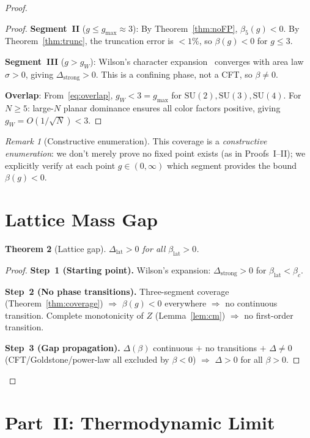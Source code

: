 \documentclass[12pt,a4paper]{article}
\theoremstyle{plain}
\newtheorem{theorem}{Theorem}[section]
\theoremstyle{definition}
\theoremstyle{remark}
\newtheorem{remark}[theorem]{Remark}
\begin{document}
\begin{proof}
\begin{proof}
\textbf{Segment~II} ($g\leq g_{\max}\approx 3$): By Theorem~\ref{thm:noFP}, $\beta_5(g)<0$. By Theorem~\ref{thm:trunc}, the truncation error is $<1\%$, so $\beta(g)<0$ for $g\leq 3$.

\textbf{Segment~III} ($g>g_W$): Wilson's character expansion~\cite{Wilson1974} converges with area law $\sigma>0$, giving $\Delta_{\mathrm{strong}}>0$. This is a confining phase, not a CFT, so $\beta\neq 0$.

\textbf{Overlap}: From~\eqref{eq:overlap}, $g_W<3=g_{\max}$ for $\mathrm{SU}(2),\mathrm{SU}(3),\mathrm{SU}(4)$. For $N\geq 5$: large-$N$ planar dominance ensures all color factors positive, giving $g_W=O(1/\sqrt{N})<3$.
\end{proof}

\begin{remark}[Constructive enumeration]
This coverage is a \emph{constructive enumeration}: we don't merely prove no fixed point exists (as in Proofs~I--II); we explicitly verify at each point $g\in(0,\infty)$ which segment provides the bound $\beta(g)<0$.
\end{remark}

\section{Lattice Mass Gap}\label{sec:latgap}

\begin{theorem}[Lattice gap]\label{thm:latgap}
$\Delta_{\mathrm{lat}}>0$ for all $\beta_{\mathrm{lat}}>0$.
\end{theorem}

\begin{proof}
\textbf{Step~1 (Starting point).} Wilson's expansion: $\Delta_{\mathrm{strong}}>0$ for $\beta_{\mathrm{lat}}<\beta_c$.

\textbf{Step~2 (No phase transitions).} Three-segment coverage (Theorem~\ref{thm:coverage}) $\Rightarrow$ $\beta(g)<0$ everywhere $\Rightarrow$ no continuous transition. Complete monotonicity of $Z$ (Lemma~\ref{lem:cm}) $\Rightarrow$ no first-order transition.

\textbf{Step~3 (Gap propagation).} $\Delta(\beta)$ continuous $+$ no transitions $+$ $\Delta\neq 0$ (CFT/Goldstone/power-law all excluded by $\beta<0$) $\Rightarrow$ $\Delta>0$ for all $\beta>0$.
\end{proof}
\end{proof}

\section{Part~II: Thermodynamic Limit}\label{sec:thermo}
\end{document}
